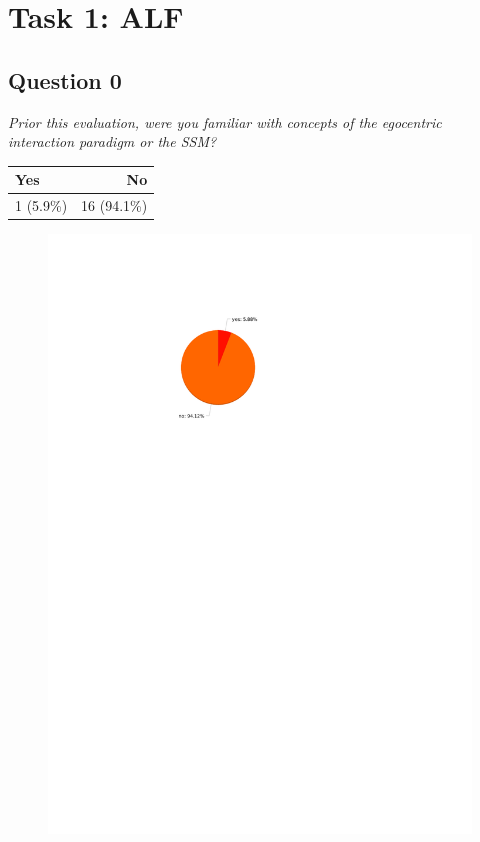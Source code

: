 \section{Task 1: ALF} %
\label{sec:res_alf_task}

\subsection{Question 0}\label{question1:0}
\emph{Prior this evaluation, were you familiar with concepts of the egocentric interaction paradigm or the SSM?}
\begin{table}[H]
	\begin{center}
		\small \begin{tabular*}{0.35\columnwidth}{lr}
			\\ \hline \hline
			Yes & No \\ \hline \hline

		 	1 (5.9\%) & 16 (94.1\%)\\ \hline
		\end{tabular*}
	\end{center}
\end{table}

\begin{figure}[H]
	\centering
	\includegraphics[width=0.6\linewidth]{gfx/Chapter_EvaluationResults/ALFTask/question0}
\end{figure}

